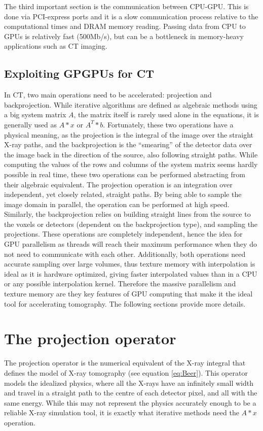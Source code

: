 The third important section is the communication between CPU-GPU. This is done via PCI-express ports and it is a slow communication process relative to the computational times and DRAM memory reading. Passing data from CPU to GPUs is relatively fast (500Mb/s), but can be a bottleneck in memory-heavy applications such as CT imaging.



\subsection{Exploiting GPGPUs for CT}

In CT, two main operations need to be accelerated: projection and backprojection. While iterative algorithms are defined as algebraic methods using a big system matrix $A$, the matrix itself is rarely used alone in the equations, it is generally used as $A*x$ or $A^T*b$. Fortunately, these two operations have a physical meaning, as the projection is the integral of the image over the straight X-ray paths, and the backprojection is the ``smearing'' of the detector data over the image back in the direction of the source, also following straight paths. While computing the values of the rows and columns of the system matrix seems hardly possible in real time, these two operations can be performed abstracting from their algebraic equivalent. The projection operation is an integration over independent, yet closely related, straight paths. By being able to sample the image domain in parallel, the operation can be performed at high speed. Similarly, the backprojection relies on building straight lines from the source to the voxels or detectors (dependent on the backprojection type), and sampling the projections. These operations are completely independent, hence the idea for GPU parallelism as threads will reach their maximum performance when they do not need to communicate with each other.  Additionally, both operations need accurate sampling over large volumes, thus texture memory with interpolation is ideal as it is hardware optimized, giving faster interpolated values than in a CPU or any possible interpolation kernel. Therefore the massive parallelism and texture memory are they key features of GPU computing that make it the ideal tool for accelerating tomography. The following sections provide more details.

\section{The projection operator}
The projection operator is the numerical equivalent of the X-ray integral that defines the model of X-ray tomography (see equation \ref{eq:Beer}). This operator models the idealized physics, where all the X-rays have an infinitely small width and travel in a straight path to the centre of each detector pixel, and all with the same energy. While this may not represent the physics accurately enough to be a reliable X-ray  simulation tool, it is exactly what iterative methods need the $A*x$ operation. 


